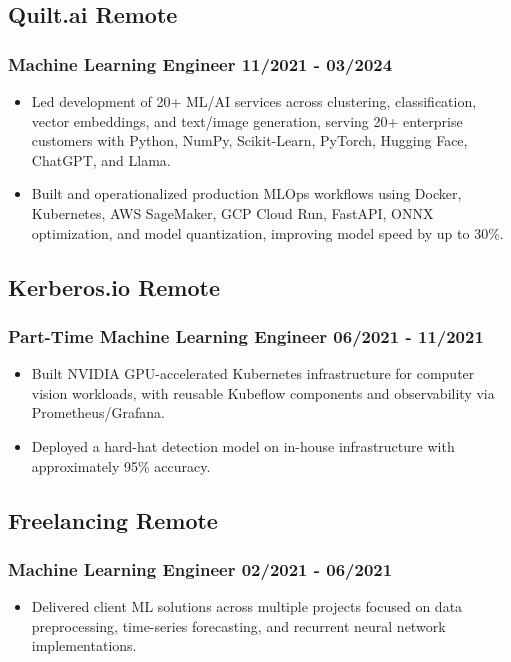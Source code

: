 \documentclass[11pt]{article} %
\begin{document}
\subsection{Quilt.ai \hfill Remote}
\subsubsection{Machine Learning Engineer \hfill 11/2021 - 03/2024}
\begin{itemize}
	\item Led development of 20+ ML/AI services across clustering, classification, vector embeddings, and text/image generation, serving 20+ enterprise customers with Python, NumPy, Scikit-Learn, PyTorch, Hugging Face, ChatGPT, and Llama.
	\item Built and operationalized production MLOps workflows using Docker, Kubernetes, AWS SageMaker, GCP Cloud Run, FastAPI, ONNX optimization, and model quantization, improving model speed by up to 30\%.
\end{itemize}

\subsection{Kerberos.io \hfill Remote}
\subsubsection{Part-Time Machine Learning Engineer \hfill 06/2021 - 11/2021}
\begin{itemize}
	\item Built NVIDIA GPU-accelerated Kubernetes infrastructure for computer vision workloads, with reusable Kubeflow components and observability via Prometheus/Grafana.
	\item Deployed a hard-hat detection model on in-house infrastructure with approximately 95\% accuracy.
\end{itemize}

\subsection{Freelancing \hfill Remote}
\subsubsection{Machine Learning Engineer \hfill 02/2021 - 06/2021}
\begin{itemize}
	\item Delivered client ML solutions across multiple projects focused on data preprocessing, time-series forecasting, and recurrent neural network implementations.
\end{itemize}
\end{document}
